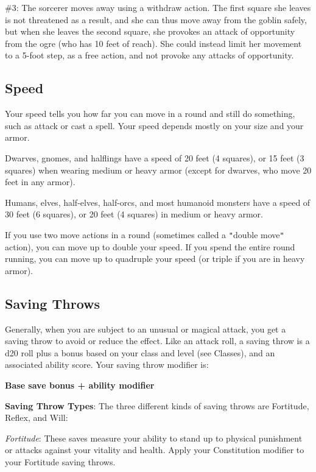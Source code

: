 \#3: The sorcerer moves away using a withdraw action. The first square she leaves is not threatened as a result, and she can thus move away from the goblin safely, but when she leaves the second square, she provokes an attack of opportunity from the ogre (who has 10 feet of reach). She could instead limit her movement to a 5-foot step, as a free action, and not provoke any attacks of opportunity.


				
\subsection{Speed}

				
Your speed tells you how far you can move in a round and still do something, such as attack or cast a spell. Your speed depends mostly on your size and your armor.
				
Dwarves, gnomes, and halflings have a speed of 20 feet (4 squares), or 15 feet (3 squares) when wearing medium or heavy armor (except for dwarves, who move 20 feet in any armor).
				
Humans, elves, half-elves, half-orcs, and most humanoid monsters have a speed of 30 feet (6 squares), or 20 feet (4 squares) in medium or heavy armor.
				
If you use two move actions in a round (sometimes called a \texttt{{}"{}}double move\texttt{{}"{}} action), you can move up to double your speed. If you spend the entire round running, you can move up to quadruple your speed (or triple if you are in heavy armor). 
				
\subsection{Saving Throws}

				
Generally, when you are subject to an unusual or magical attack, you get a saving throw to avoid or reduce the effect. Like an attack roll, a saving throw is a d20 roll plus a bonus based on your class and level (see Classes), and an associated ability score. Your saving throw modifier is:
				
{\large \textbf{Base save bonus + ability modifier}}
				
\textbf{Saving Throw Types}: The three different kinds of saving throws are Fortitude, Reflex, and Will:
				
\textit{Fortitude}: These saves measure your ability to stand up to physical punishment or attacks against your vitality and health. Apply your Constitution modifier to your Fortitude saving throws. 
				
